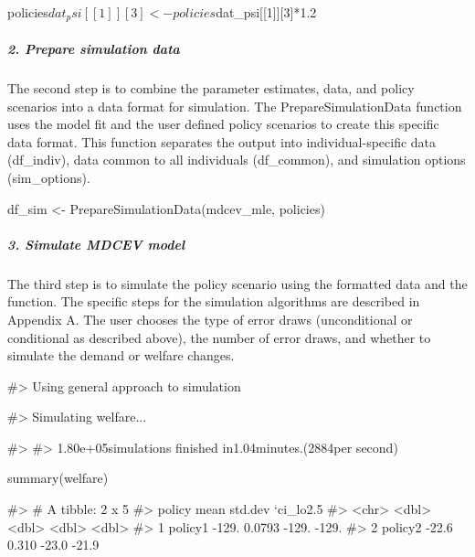 \begin{Schunk}
\begin{Sinput}
policies$dat_psi[[1]][3] <- policies$dat_psi[[1]][3]*1.2
\end{Sinput}
\end{Schunk}

\hypertarget{prepare-simulation-data}{%
\subparagraph{2. Prepare simulation
data}\label{prepare-simulation-data}}

The second step is to combine the parameter estimates, data, and policy
scenarios into a data format for simulation. The PrepareSimulationData
function uses the model fit and the user defined policy scenarios to
create this specific data format. This function separates the output
into individual-specific data (df\_indiv), data common to all
individuals (df\_common), and simulation options (sim\_options).

\begin{Schunk}
\begin{Sinput}
df_sim <- PrepareSimulationData(mdcev_mle, policies)
\end{Sinput}
\end{Schunk}

\hypertarget{simulate-mdcev-model}{%
\subparagraph{3. Simulate MDCEV model}\label{simulate-mdcev-model}}

The third step is to simulate the policy scenario using the formatted
data and the  function. The specific steps for the
simulation algorithms are described in Appendix A. The user chooses the
type of error draws (unconditional or conditional as described above),
the number of error draws, and whether to simulate the demand or welfare
changes.

\begin{Schunk}
\begin{Soutput}
#> Using general approach to simulation
\end{Soutput}
\begin{Soutput}
#> Simulating welfare...
\end{Soutput}
\begin{Soutput}
#> 
#> 1.80e+05simulations finished in1.04minutes.(2884per second)
\end{Soutput}
\begin{Sinput}
summary(welfare)
\end{Sinput}
\begin{Soutput}
#> # A tibble: 2 x 5
#>   policy    mean std.dev `ci_lo2.5%` `ci_hi97.5%`
#>   <chr>    <dbl>   <dbl>       <dbl>        <dbl>
#> 1 policy1 -129.   0.0793      -129.        -129. 
#> 2 policy2  -22.6  0.310        -23.0        -21.9
\end{Soutput}
\end{Schunk}

